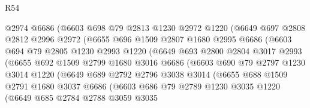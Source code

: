 \begin{lexlean}{R54}
\begin{coremodule}
                  @2974
                  @6686
                  (@6603
                    @698
                    @79
                    @2813
                    @1230
                    @2972
                    @1220
                    (@6649
                      @697
                      @2808
                      @2812
                      @2996
                      @2972
                      (@6655
                        @696
                        @1509
                        @2807
                        @1680
                        @2995
                        @6686
                        (@6603
                          @694
                          @79
                          @2805
                          @1230
                          @2993
                          @1220
                          (@6649
                            @693
                            @2800
                            @2804
                            @3017
                            @2993
                            (@6655
                              @692
                              @1509
                              @2799
                              @1680
                              @3016
                              @6686
                              (@6603
                                @690
                                @79
                                @2797
                                @1230
                                @3014
                                @1220
                                (@6649
                                  @689
                                  @2792
                                  @2796
                                  @3038
                                  @3014
                                  (@6655
                                    @688
                                    @1509
                                    @2791
                                    @1680
                                    @3037
                                    @6686
                                    (@6603
                                      @686
                                      @79
                                      @2789
                                      @1230
                                      @3035
                                      @1220
                                      (@6649
                                        @685
                                        @2784
                                        @2788
                                        @3059
                                        @3035

\end{coremodule}
\end{lexlean}
